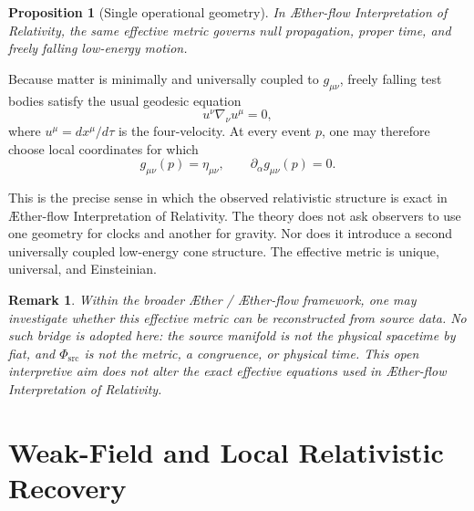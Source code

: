 \documentclass[11pt]{article}
\newcommand{\Aether}{\AE{}ther}
\newcommand{\Aflow}{\AE{}ther-flow}
\newcommand{\TheoryName}{\Aflow{} Interpretation of Relativity}
\newcommand{\TheoryProgram}{\Aether{} / \Aflow{} framework}
\newcommand{\PhiSrc}{\Phi_{\mathrm{src}}}
\newtheorem{proposition}{Proposition}
\newtheorem{remark}{Remark}
\begin{document}
\begin{proposition}[Single operational geometry]
In \TheoryName{}, the same effective metric governs null propagation, proper time, and freely falling low-energy motion.
\end{proposition}

Because matter is minimally and universally coupled to \(g_{\mu\nu}\), freely falling test bodies satisfy the usual geodesic equation
\begin{equation}
u^\nu \nabla_\nu u^\mu = 0,
\label{eq:geodesic}
\end{equation}
where \(u^\mu = dx^\mu/d\tau\) is the four-velocity. At every event \(p\), one may therefore choose local coordinates for which
\begin{equation}
g_{\mu\nu}(p)=\eta_{\mu\nu},
\qquad
\partial_\alpha g_{\mu\nu}(p)=0.
\label{eq:localinertial}
\end{equation}

This is the precise sense in which the observed relativistic structure is exact in \TheoryName{}. The theory does not ask observers to use one geometry for clocks and another for gravity. Nor does it introduce a second universally coupled low-energy cone structure. The effective metric is unique, universal, and Einsteinian.

\begin{remark}
Within the broader \TheoryProgram{}, one may investigate whether this
effective metric can be reconstructed from source data. No such bridge is
adopted here: the source manifold is not the physical spacetime by fiat, and
\(\PhiSrc\) is not the metric, a congruence, or physical time. This open
interpretive aim does not alter the exact effective equations used in
\TheoryName{}.
\end{remark}

\section{Weak-Field and Local Relativistic Recovery}
\end{document}
